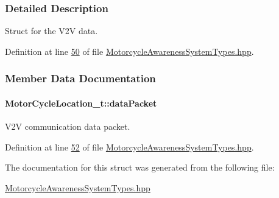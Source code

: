 \subsubsection{Detailed Description}
Struct for the V2\-V data. 

Definition at line \hyperlink{MotorcycleAwarenessSystemTypes_8hpp_source_l00050}{50} of file \hyperlink{MotorcycleAwarenessSystemTypes_8hpp_source}{Motorcycle\-Awareness\-System\-Types.\-hpp}.



\subsubsection{Member Data Documentation}
\hypertarget{structMotorCycleLocation__t_a1f854587b19dbe91dffd637ce70be62e}{
\paragraph[{data\-Packet}]{ Motor\-Cycle\-Location\-\_\-t\-::data\-Packet}}\label{structMotorCycleLocation__t_a1f854587b19dbe91dffd637ce70be62e}


V2\-V communication data packet. 



Definition at line \hyperlink{MotorcycleAwarenessSystemTypes_8hpp_source_l00052}{52} of file \hyperlink{MotorcycleAwarenessSystemTypes_8hpp_source}{Motorcycle\-Awareness\-System\-Types.\-hpp}.



The documentation for this struct was generated from the following file\-:\begin{DoxyCompactItemize}
\item 
\hyperlink{MotorcycleAwarenessSystemTypes_8hpp}{Motorcycle\-Awareness\-System\-Types.\-hpp}\end{DoxyCompactItemize}
